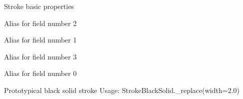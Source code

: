 \documentclass[letterpaper,10pt,english]{sphinxmanual}
\begin{document}
\begin{fulllineitems}
\label{\detokenize{ref/util/plot/Stroke:TotalDepth.util.plot.Stroke.Stroke}}
Stroke basic properties

\begin{fulllineitems}
\label{\detokenize{ref/util/plot/Stroke:TotalDepth.util.plot.Stroke.Stroke.coding}}
Alias for field number 2

\end{fulllineitems}


\begin{fulllineitems}
\label{\detokenize{ref/util/plot/Stroke:TotalDepth.util.plot.Stroke.Stroke.colour}}
Alias for field number 1

\end{fulllineitems}


\begin{fulllineitems}
\label{\detokenize{ref/util/plot/Stroke:TotalDepth.util.plot.Stroke.Stroke.opacity}}
Alias for field number 3

\end{fulllineitems}


\begin{fulllineitems}
\label{\detokenize{ref/util/plot/Stroke:TotalDepth.util.plot.Stroke.Stroke.width}}
Alias for field number 0

\end{fulllineitems}


\end{fulllineitems}


\begin{fulllineitems}
\label{\detokenize{ref/util/plot/Stroke:TotalDepth.util.plot.Stroke.StrokeBlackSolid}}
Prototypical black solid stroke
Usage: StrokeBlackSolid.\_replace(width=2.0)

\end{fulllineitems}
\end{document}
